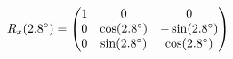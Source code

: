 \documentclass[preview]{standalone}
\begin{document}
\begin{align*}
\special{dvisvgm:raw <g id='unique000'>}R_x(2.8^\circ) = \begin{pmatrix} 1 & 0 & 0 \\ 0 & \cos(2.8^\circ) & -\sin(2.8^\circ) \\ 0 & \sin(2.8^\circ) & \cos(2.8^\circ) \end{pmatrix}\special{dvisvgm:raw </g>}
\end{align*}
\end{document}
